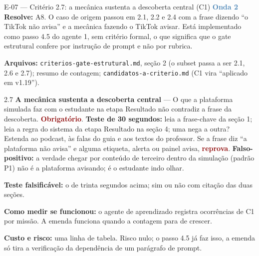 \documentclass[11pt,a4paper]{article}
\newcommand{\obrig}{\textcolor{DarkRed}{\textbf{Obrigatório}}}
\newcommand{\rep}{\textcolor{DarkRed}{\textbf{reprova}}}
\newcommand{\onda}[1]{\textcolor{SteelBlue}{\textbf{Onda #1}}}
\begin{document}
\begin{emendabox}{E-07 --- Critério 2.7: a mecânica sustenta a descoberta central (C1) \hfill \onda{2}}
\textbf{Resolve:} A8. O caso de origem passou em 2.1, 2.2 e 2.4 com a frase dizendo ``o TikTok
não avisa'' e a mecânica fazendo o TikTok avisar. Está implementado como passo 4.5 do agente 1,
sem critério formal, o que significa que o gate estrutural confere por instrução de prompt e não
por rubrica.

\textbf{Arquivos:} \texttt{criterios-gate-estrutural.md}, seção 2 (o subset passa a ser 2.1, 2.6
e 2.7); resumo de contagem; \texttt{candidatos-a-criterio.md} (C1 vira ``aplicado em v1.19'').

\begin{depoisbox}\small
2.7 \textbf{A mecânica sustenta a descoberta central} --- O que a plataforma simulada faz com o
estudante na etapa Resultado não contradiz a frase da descoberta. \obrig{}. \textbf{Teste de 30
segundos:} leia a frase-chave da seção 1; leia a regra do sistema da etapa Resultado na seção 4;
uma nega a outra? Estenda ao podcast, às falas do guia e aos textos do professor. Se a frase diz
``a plataforma não avisa'' e alguma etiqueta, alerta ou painel avisa, \rep. \textbf{Falso-positivo:}
a verdade chegar por conteúdo de terceiro dentro da simulação (padrão P1) não é a plataforma
avisando; é o estudante indo olhar.
\end{depoisbox}

\textbf{Teste falsificável:} o de trinta segundos acima; sim ou não com citação das duas seções.

\textbf{Como medir se funcionou:} o agente de aprendizado registra ocorrências de C1 por missão.
A emenda funciona quando a contagem para de crescer.

\textbf{Custo e risco:} uma linha de tabela. Risco nulo; o passo 4.5 já faz isso, a emenda só
tira a verificação da dependência de um parágrafo de prompt.
\end{emendabox}
\end{document}

